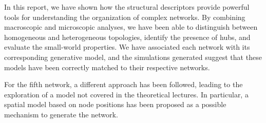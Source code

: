 \documentclass{article}
\begin{document}
In this report, we have shown how the structural descriptors provide powerful tools for understanding the organization of complex networks. By combining macroscopic and microscopic analyses, we have been able to distinguish between homogeneous and heterogeneous topologies, identify the presence of hubs, and evaluate the small-world properties. We have associated each network with its corresponding generative model, and the simulations generated suggest that these models have been correctly matched to their respective networks.

For the fifth network, a different approach has been followed, leading to the exploration of a model not covered in the theoretical lectures. In particular, a spatial model based on node positions has been proposed as a possible mechanism to generate the network.

\newpage


\clearpage


% 
\end{document}
